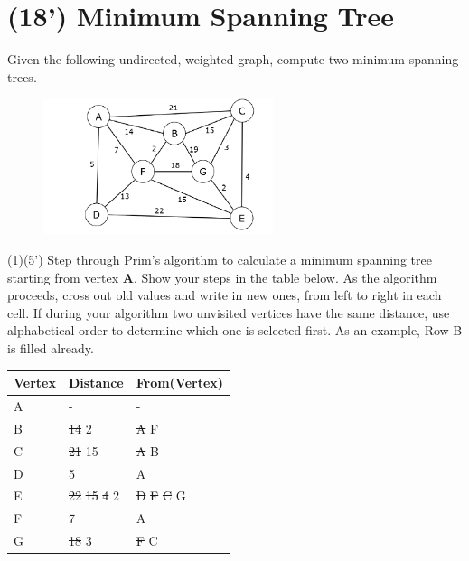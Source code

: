 \documentclass{article}
\begin{document}
\section{(18') Minimum Spanning Tree}
Given the following undirected, weighted graph, compute two minimum spanning trees.
\begin{figure}[H]
	\centering
	\includegraphics[width=0.6\textwidth]{./mst}
\end{figure}

(1)(5') Step through Prim’s algorithm to calculate a minimum spanning tree starting from vertex \textbf{A}. Show your steps in the table below. As the algorithm proceeds, cross out old values and write in new ones, from left to right in each cell. If during your algorithm two unvisited vertices have the same distance, use alphabetical order to determine which one is selected first. As an example, Row B is filled already.\\
\begin{table}[htbp]
	\begin{tabular}{|p{4cm}|p{4cm}|p{4cm}|}
		\hline 
		\textbf{Vertex} & \textbf{Distance} & \textbf{From(Vertex)}\\ 
		\hline 
		A&- &-  \\
		\hline  
		B&\sout{14} 2 &\sout{A} F \\ 
		\hline 
		C&\sout{21} 15 &\sout{A} B  \\  
		\hline 
		D&5  &A \\
		\hline 
		E&\sout{22} \sout{15} \sout{4} 2 &\sout{D} \sout{F} \sout{C} G  \\ 
		\hline 
		F&7  &A  \\ 
		\hline 
		G&\sout{18} 3  &\sout{F} C \\
		\hline 
	\end{tabular} 
\end{table}
\pagebreak
\end{document}
